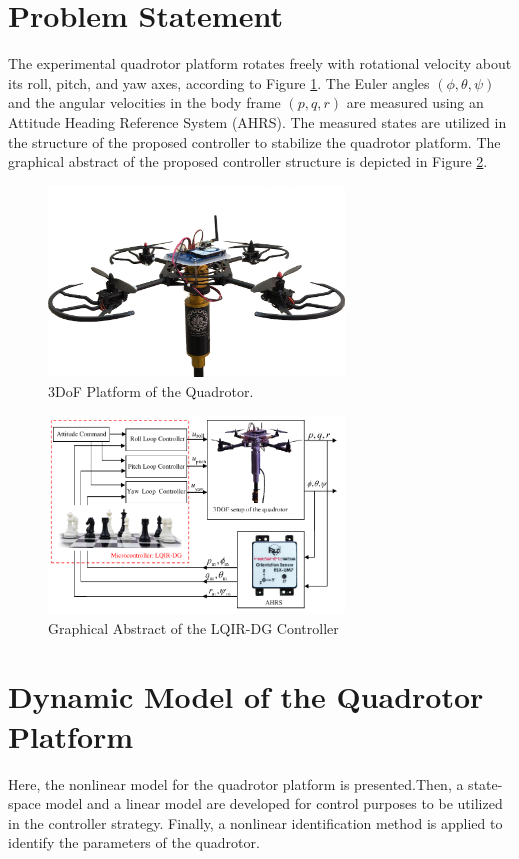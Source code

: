 \documentclass[preprint,12pt,authoryear]{elsarticle}
\begin{document}
\section{Problem Statement}\label{sec:problem}
\noindent The experimental quadrotor platform rotates freely with rotational velocity about its roll, pitch, and yaw axes, according to Figure \ref{fig:quadrotor}.
The Euler angles $(\phi, \theta, \psi)$ and the angular velocities in the body frame $(p, q, r)$ are measured using an Attitude Heading Reference System (AHRS).
The measured states are utilized in the structure of the proposed controller to stabilize the quadrotor platform.
The graphical abstract of the proposed controller structure is depicted in Figure \ref{fig:blockdiagram}.
\begin{figure}[H]
    \centering
    \includegraphics[width=0.7\textwidth]{../Figure/3DOFQuad.png}
    \caption{3DoF Platform of the Quadrotor.}
    \label{fig:quadrotor}
 \end{figure}
 
 \begin{figure}[H]
    \centering
    \includegraphics[width=0.7\textwidth]{../Figure/schematic.pdf}
    \caption{Graphical Abstract of the LQIR-DG Controller}
    \label{fig:blockdiagram}
 \end{figure}
 \section{Dynamic Model of the Quadrotor Platform}\label{sec:modeling}
 \noindent Here, the nonlinear model for the quadrotor platform is presented.Then, a state-space model and a linear model are developed for control purposes to be utilized in the controller strategy.
 Finally, a nonlinear identification method is applied to identify the parameters of the quadrotor.
\end{document}
